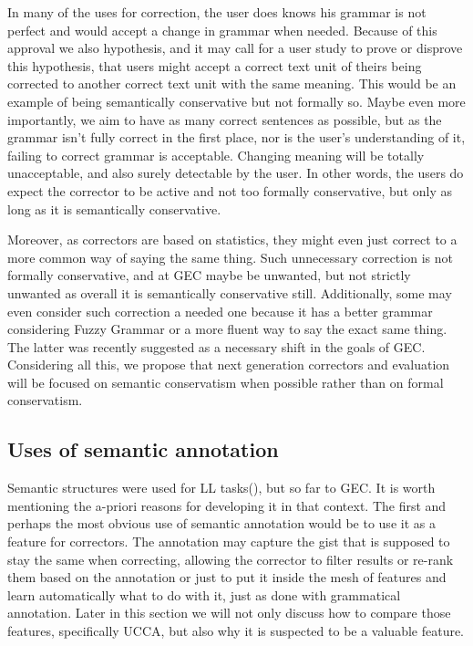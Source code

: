 \documentclass[english]{article}
\begin{document}
In many of the uses for correction,
the user does knows his grammar is not perfect and would accept
a change in grammar when needed. Because of this approval we also
hypothesis, and it may call for a user study to prove or disprove
this hypothesis, that users might accept a correct text unit of theirs
being corrected to another correct text unit with the same meaning.
This would be an example of being semantically conservative but not formally so.
Maybe even more importantly, we aim to have as many correct sentences
as possible, but as the grammar isn't fully correct in the first place,
nor is the user's understanding of it, failing to correct grammar
is acceptable. Changing meaning will be totally unacceptable, and
also surely detectable by the user. In other words, the users do expect
the corrector to be active and not too formally conservative, but
only as long as it is semantically conservative. 

Moreover, as correctors are based on statistics, they might even
just correct to a more common way of saying the same thing. Such unnecessary
correction is not formally conservative, and at GEC maybe be unwanted, but not strictly unwanted as overall
it is semantically conservative still. Additionally, some may even
consider such correction a needed one because it has a better grammar considering
Fuzzy Grammar\cite{lakoff1973fuzzy,madnani2011they} or a more fluent
way to say the exact same thing. The latter was recently suggested as a necessary
shift in the goals of GEC\cite{sakaguchi2016reassessing}.
Considering all this, we propose that next generation correctors and evaluation will be focused on semantic conservatism
when possible rather than on formal conservatism.

\subsection{Uses of semantic annotation}

Semantic structures were used for LL tasks(\cite{king2013shallow}), but so far to GEC. It is worth mentioning the a-priori reasons for developing
it in that context. The first and perhaps the most obvious use of semantic annotation
would be to use it as a feature for correctors. The annotation may
capture the gist that is supposed to stay the same when correcting,
allowing the corrector to filter results or re-rank them based on
the annotation or just to put it inside the mesh of features and learn
automatically what to do with it, just as done with grammatical annotation.
Later in this section we will not only discuss how to compare those
features, specifically UCCA, but also why it is suspected to be a
valuable feature.
\end{document}
